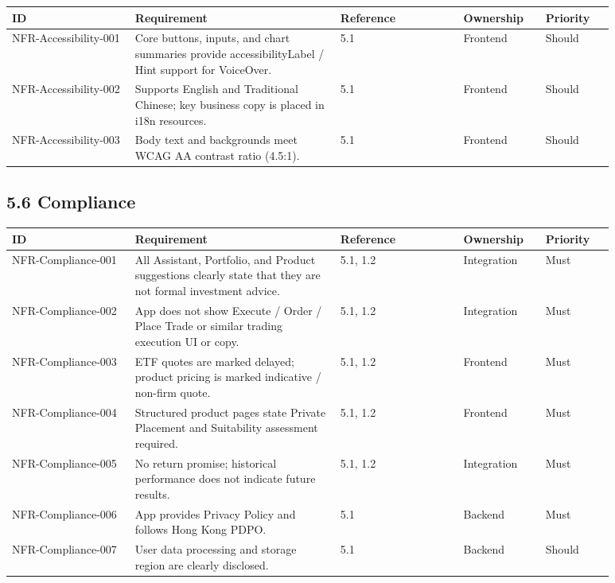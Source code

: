 \begingroup
\small
\begin{longtable}{L{0.18\linewidth}L{0.30\linewidth}L{0.18\linewidth}L{0.12\linewidth}L{0.10\linewidth}}
\toprule
\textbf{ID} & \textbf{Requirement} & \textbf{Reference} & \textbf{Ownership} & \textbf{Priority} \\
\midrule
NFR-Accessibility-001 & Core buttons, inputs, and chart summaries provide accessibilityLabel / Hint support for VoiceOver. & 5.1 & Frontend & Should \\
NFR-Accessibility-002 & Supports English and Traditional Chinese; key business copy is placed in i18n resources. & 5.1 & Frontend & Should \\
NFR-Accessibility-003 & Body text and backgrounds meet WCAG AA contrast ratio (4.5:1). & 5.1 & Frontend & Should \\
\bottomrule
\end{longtable}
\endgroup

\subsection{5.6 Compliance}

\begingroup
\small
\begin{longtable}{L{0.18\linewidth}L{0.30\linewidth}L{0.18\linewidth}L{0.12\linewidth}L{0.10\linewidth}}
\toprule
\textbf{ID} & \textbf{Requirement} & \textbf{Reference} & \textbf{Ownership} & \textbf{Priority} \\
\midrule
NFR-Compliance-001 & All Assistant, Portfolio, and Product suggestions clearly state that they are not formal investment advice. & 5.1, 1.2 & Integration & Must \\
NFR-Compliance-002 & App does not show Execute / Order / Place Trade or similar trading execution UI or copy. & 5.1, 1.2 & Integration & Must \\
NFR-Compliance-003 & ETF quotes are marked delayed; product pricing is marked indicative / non-firm quote. & 5.1, 1.2 & Frontend & Must \\
NFR-Compliance-004 & Structured product pages state Private Placement and Suitability assessment required. & 5.1, 1.2 & Frontend & Must \\
NFR-Compliance-005 & No return promise; historical performance does not indicate future results. & 5.1, 1.2 & Integration & Must \\
NFR-Compliance-006 & App provides Privacy Policy and follows Hong Kong PDPO. & 5.1 & Backend & Must \\
NFR-Compliance-007 & User data processing and storage region are clearly disclosed. & 5.1 & Backend & Should \\
\bottomrule
\end{longtable}
\endgroup

